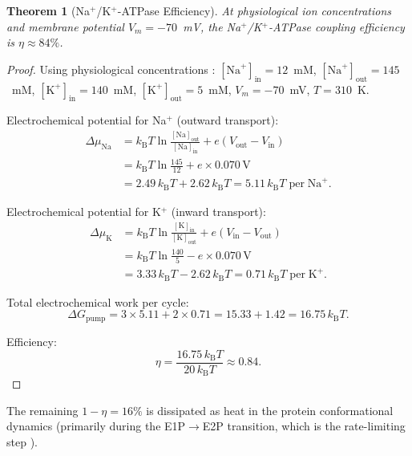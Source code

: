 \documentclass[11pt,twocolumn,a4paper]{article}
\newtheorem{theorem}{Theorem}[section]
\theoremstyle{definition}
\theoremstyle{remark}
\newcommand{\kB}{k_{\mathrm{B}}}
\begin{document}
\begin{theorem}[Na$^+$/K$^+$-ATPase Efficiency]
\label{thm:efficiency}
At physiological ion concentrations and membrane potential $V_m = -70$~mV,
the Na$^+$/K$^+$-ATPase coupling efficiency is $\eta \approx 84\%$.
\end{theorem}

\begin{proof}
Using physiological concentrations \citep{skou1998}:
$[\mathrm{Na}^+]_{\mathrm{in}} = 12$~mM,
$[\mathrm{Na}^+]_{\mathrm{out}} = 145$~mM,
$[\mathrm{K}^+]_{\mathrm{in}} = 140$~mM,
$[\mathrm{K}^+]_{\mathrm{out}} = 5$~mM,
$V_m = -70$~mV, $T = 310$~K.

\noindent Electrochemical potential for Na$^+$ (outward transport):
\begin{align}
\Delta\mu_{\mathrm{Na}} &= \kB T \ln\frac{[\mathrm{Na}]_{\mathrm{out}}}{[\mathrm{Na}]_{\mathrm{in}}}
+ e(V_{\mathrm{out}} - V_{\mathrm{in}}) \nonumber\\
&= \kB T \ln\frac{145}{12} + e \times 0.070\,\mathrm{V}\nonumber\\
&= 2.49\,\kB T + 2.62\,\kB T = 5.11\,\kB T\;\mathrm{per\;Na}^+. \label{eq:dmuNa}
\end{align}

\noindent Electrochemical potential for K$^+$ (inward transport):
\begin{align}
\Delta\mu_{\mathrm{K}} &= \kB T \ln\frac{[\mathrm{K}]_{\mathrm{in}}}{[\mathrm{K}]_{\mathrm{out}}}
+ e(V_{\mathrm{in}} - V_{\mathrm{out}}) \nonumber\\
&= \kB T \ln\frac{140}{5} - e \times 0.070\,\mathrm{V}\nonumber\\
&= 3.33\,\kB T - 2.62\,\kB T = 0.71\,\kB T\;\mathrm{per\;K}^+. \label{eq:dmuK}
\end{align}

\noindent Total electrochemical work per cycle:
\begin{equation}
\Delta G_{\mathrm{pump}} = 3 \times 5.11 + 2 \times 0.71 = 15.33 + 1.42
= 16.75\,\kB T. \label{eq:gpump}
\end{equation}

\noindent Efficiency:
\begin{equation}
\eta = \frac{16.75\,\kB T}{20\,\kB T} \approx 0.84. \label{eq:efficiency}
\end{equation}
\end{proof}

The remaining $1-\eta = 16\%$ is dissipated as heat in the protein conformational
dynamics (primarily during the E1P$\to$E2P transition, which is the rate-limiting
step \citep{pedersen2010}).
\end{document}
